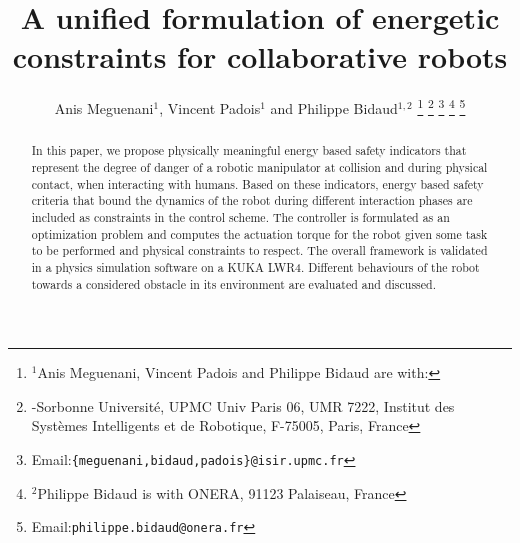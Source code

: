 \documentclass[letterpaper, 10 pt, conference]{ieeeconf}      %
\title{A unified formulation of energetic constraints for collaborative robots}
\author{Anis Meguenani$^{1}$, Vincent Padois$^{1}$ and Philippe Bidaud$^{1,2}$ 
\thanks{$^{1}$Anis Meguenani, Vincent Padois and Philippe Bidaud are with:}
\thanks{-Sorbonne Universit\'{e}, UPMC Univ Paris 06, UMR 7222, Institut des Syst\`{e}mes Intelligents et de Robotique, F-75005, Paris, France}
\thanks{Email:{\tt\small \{meguenani,bidaud,padois\}@isir.upmc.fr}}
\thanks{$^{2}$Philippe Bidaud is with ONERA, 91123 Palaiseau, France}
\thanks{Email:{\tt\small philippe.bidaud@onera.fr}}}
\begin{document}
\maketitle
\begin{abstract}
In this paper, we propose physically meaningful energy based safety indicators that represent the degree of danger of a robotic manipulator at collision and during physical contact, when interacting with humans. Based on these indicators, energy based safety criteria that bound the dynamics of the robot during different interaction phases are included as constraints in the control scheme.  The controller is formulated as an optimization problem and computes the actuation torque for the robot given some task to be performed and physical constraints to respect. The overall framework is validated in a physics simulation software on a KUKA LWR4. Different behaviours of the robot towards a considered obstacle in its environment are evaluated and discussed.

\end{abstract}
\end{document}
